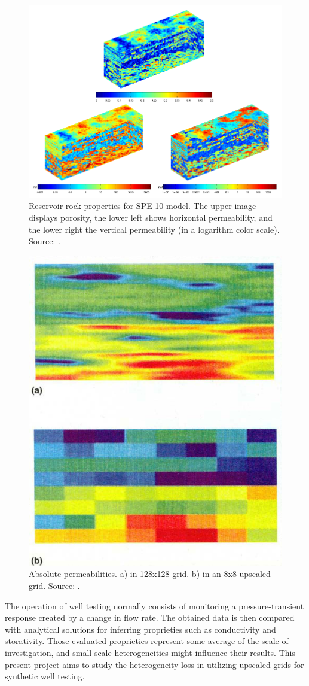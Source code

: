 \begin{figure}
	\centering
	\includegraphics[width=0.7\linewidth]{Images/11}
	\caption{Reservoir rock properties for SPE 10 model. The upper image displays porosity, the lower left shows horizontal permeability, and the lower right the vertical permeability (in a logarithm color scale). Source: \cite{Lie2015}.}
	\label{fig:11}
\end{figure}
\begin{figure}
	\centering
	\includegraphics[width=0.4\linewidth]{Images/14}
	\caption{Absolute permeabilities. a) in 128x128 grid. b) in an 8x8 upscaled grid. Source: \cite{Christie1996}.}
	\label{fig:14}
\end{figure}
The operation of well testing normally consists of monitoring a pressure-transient response created by a change in flow rate. The obtained data is then compared with analytical solutions for inferring proprieties such as conductivity and storativity. Those evaluated proprieties represent some average of the scale of investigation, and small-scale heterogeneities might influence their results. This present project aims to study the heterogeneity loss in utilizing upscaled grids for synthetic well testing.
